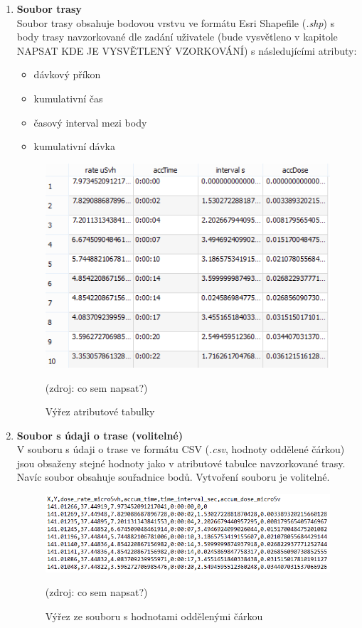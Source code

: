 \begin{enumerate}
	\item \textbf{Soubor trasy} \\
	Soubor trasy obsahuje bodovou vrstvu ve formátu Esri Shapefile (\textit{.shp}) s body trasy navzorkované dle zadání uživatele (bude vysvětleno v kapitole NAPSAT KDE JE VYSVĚTLENÝ VZORKOVÁNÍ) s následujícími atributy:
		\begin{itemize}
			\item dávkový příkon
			\item kumulativní čas
			\item časový interval mezi body
			\item kumulativní dávka
		\end{itemize}
			\begin{figure}[H]
    			\centering
      			\includegraphics[scale=0.8]{./pictures/atributova_tabulka.png}
      				\caption[Výřez atributové tabulky]{Výřez atributové tabulky}(zdroj: co sem napsat?)
     				\label{fig:atributova_tabulka}
  			\end{figure}
  	
  	\item \textbf{Soubor s údaji o trase (volitelné)} \\
  	V souboru s údaji o trase ve formátu CSV (\textit{.csv}, hodnoty oddělené čárkou) jsou obsaženy stejné hodnoty jako v atributové tabulce navzorkované trasy. Navíc soubor obsahuje souřadnice bodů. Vytvoření souboru je volitelné. 
  			\begin{figure}[H]
    			\centering
      			\includegraphics[scale=0.8]{./pictures/csv.png}
      				\caption[Výřez ze souboru s hodnotami oddělenými čárkou]{Výřez ze souboru s hodnotami oddělenými čárkou}(zdroj: co sem napsat?)
     				\label{fig:csv}
  			\end{figure}	
\end{enumerate}

